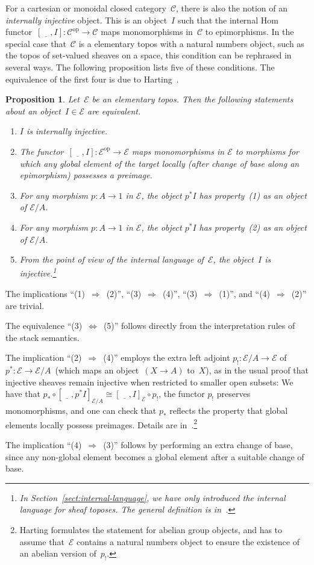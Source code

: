 \documentclass[10pt,reqno,a4paper]{amsbook}
\makeatletter
\theoremstyle{definition}
\theoremstyle{plain}
\newtheorem{prop}[defn]{Proposition}
\theoremstyle{remark}
\renewcommand{\C}{\mathcal{C}}
\newcommand{\E}{\mathcal{E}}
\newcommand{\placeholder}{\underline{\quad}}
\newcommand{\op}{\mathrm{op}}
\newcommand{\?}{\,{:}\,}
\renewcommand{\_}{\mathpunct{.}\,}
\renewenvironment{proof}[1][\proofname]{\par
  \pushQED{\qed}%
  \normalfont \topsep6\p@\@plus6\p@\relax
  \trivlist
  \item[\hskip\labelsep
        \itshape
    #1\@addpunct{.}]\ignorespaces
}{%
  \popQED\endtrivlist\@endpefalse
}
\makeatother
\begin{document}
For a cartesian or monoidal closed category~$\C$, there is also the notion of an
\emph{internally injective} object. This is an object~$I$ such that the
internal Hom functor~$[\placeholder, I] : \C^\op \to \C$ maps monomorphisms
in~$\C$ to epimorphisms. In the special case that~$\C$ is a elementary topos
with a natural numbers object, such as the topos of set-valued sheaves on a
space, this condition can be rephrased in several ways. The following
proposition lists five of these conditions. The equivalence of the first four is
due to Harting~\cite{harting}.

\begin{prop}\label{prop:notions-of-internal-injectivity}
Let~$\E$ be an elementary topos. Then
the following statements about an object~$I \in \E$ are equivalent.
\begin{enumerate}
\item $I$ is internally injective.
\item The functor~$[\placeholder, I] : \E^\op \to \E$ maps monomorphisms in $\E$
to morphisms for which any global element of the target locally (after change of
base along an epimorphism) possesses a preimage.
\item For any morphism $p : A \to 1$ in $\E$, the object $p^*I$ has property~(1)
as an object of $\E/A$.
\item For any morphism $p : A \to 1$ in $\E$, the object $p^*I$ has property~(2)
as an object of $\E/A$.
\item From the point of view of the internal language of~$\E$, the object~$I$
is injective.\footnote{In Section~\ref{sect:internal-language}, we have only
introduced the internal language for sheaf toposes. The general definition is
in~\cite[Section~7]{shulman:stack}.}
\end{enumerate}
\end{prop}

\begin{proof}
The implications ``(1)~$\Rightarrow$~(2)'', ``(3)~$\Rightarrow$~(4)'',
``(3)~$\Rightarrow$~(1)'', and ``(4)~$\Rightarrow$~(2)'' are trivial.

The equivalence ``(3)~$\Leftrightarrow$~(5)'' follows directly from the
interpretation rules of the stack semantics.

The implication ``(2)~$\Rightarrow$~(4)'' employs the
extra left adjoint $p_! : \E/A \to \E$ of $p^* : \E
\to \E/A$~(which maps an object~$(X \to A)$ to~$X$), as in the usual proof that
injective sheaves remain injective when
restricted to smaller open subsets: We have that $p_* \circ [\placeholder, p^*I]_{\E/A}
\cong [\placeholder, I]_\E \circ p_!$, the functor $p_!$ preserves monomorphisms, and one
can check that $p_*$ reflects the property that global elements locally possess
preimages. Details are in~\cite[Thm.~1.1]{harting}.\footnote{Harting formulates
the statement for abelian group objects, and has to assume that~$\E$ contains a
natural numbers object to ensure the existence of an abelian version of~$p_!$.}

The implication ``(4)~$\Rightarrow$~(3)'' follows by performing an extra change of
base, since any non-global element becomes a global element after a suitable
change of base.
\end{proof}
\end{document}
